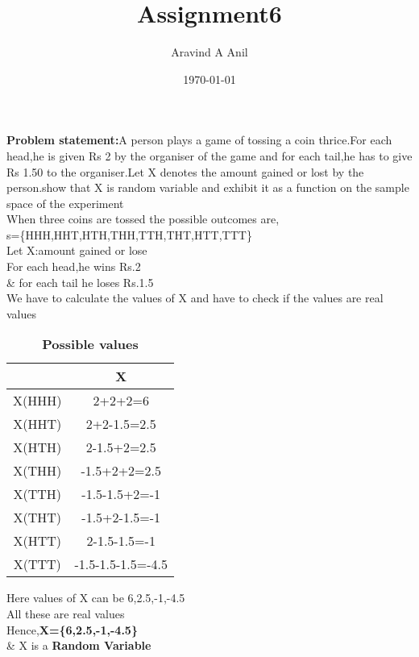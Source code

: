 \documentclass[11pt,a4paper,twocolumn]{article}
\title{Assignment6}
\author{Aravind A Anil}
\date{\today}
\begin{document}
\maketitle
\textbf{Problem statement:}A person plays a game of tossing a coin thrice.For each head,he is given Rs 2 by the organiser of the game and for each tail,he has to give Rs 1.50 to the organiser.Let X denotes the amount gained or lost by the person.show that X is random variable and exhibit it as a function on the sample space of the experiment\\
When three coins are tossed the possible outcomes are,\\
s=\{HHH,HHT,HTH,THH,TTH,THT,HTT,TTT\}\\
Let X:amount gained or lose\\
For each head,he wins Rs.2\\
\& for each tail he loses Rs.1.5\\
We have to calculate the values of X and have to check if the values are real values\\
\begin{table}[h]
    \centering
    \begin{tabular}{|c|c|}
    \hline
         &X  \\[5pt]
         \hline
         X(HHH)&2+2+2=6\\[4pt]
         \hline
         X(HHT)&2+2-1.5=2.5\\[4pt]
         \hline
         X(HTH)&2-1.5+2=2.5\\[4pt]
         \hline
         X(THH)&-1.5+2+2=2.5\\[4pt]
         \hline
         X(TTH)&-1.5-1.5+2=-1\\[4pt]
         \hline
         X(THT)&-1.5+2-1.5=-1\\[4pt]
         \hline
         X(HTT)&2-1.5-1.5=-1\\[4pt]
         \hline
         X(TTT)&-1.5-1.5-1.5=-4.5\\
         \hline
    \end{tabular}
    \caption{\textbf{Possible values}}
    \label{tab:my_label}
\end{table}
Here values of X can be 6,2.5,-1,-4.5\\
All these are real values\\
Hence,\textbf{X=\{6,2.5,-1,-4.5\}}\\
\& X is a \textbf{Random Variable}
\end{document}
